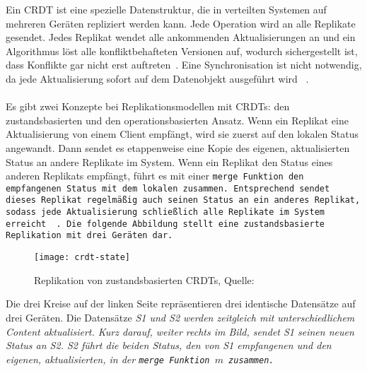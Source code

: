 %
%
Ein \gls{CRDT} ist eine spezielle Datenstruktur, die in verteilten Systemen auf mehreren Geräten repliziert werden kann. Jede Operation wird an alle Replikate gesendet. Jedes Replikat wendet alle ankommenden Aktualisierungen an und ein Algorithmus löst alle konfliktbehafteten Versionen auf, wodurch sichergestellt ist, dass Konflikte gar nicht erst auftreten~\cite{crdt_shapiro}. Eine Synchronisation ist nicht notwendig, da jede Aktualisierung sofort auf dem Datenobjekt ausgeführt wird ~\cite{crdt_shapiro2}.\\\\
%
Es gibt zwei Konzepte bei Replikationsmodellen mit \glspl{CRDT}: den zustandsbasierten und den operationsbasierten Ansatz.
%
Wenn ein Replikat eine Aktualisierung von einem Client empfängt, wird sie zuerst auf den lokalen Status angewandt.
Dann sendet es etappenweise eine Kopie des eigenen, aktualisierten Status an andere Replikate im System.
Wenn ein Replikat den Status eines anderen Replikats empfängt, führt es mit einer \tt{merge} Funktion den empfangenen Status mit dem lokalen zusammen.
Entsprechend sendet dieses Replikat regelmäßig auch seinen Status an ein anderes Replikat, sodass jede Aktualisierung schließlich alle Replikate im System erreicht ~\cite{crdt_shapiro2}.
Die folgende Abbildung stellt eine zustandsbasierte Replikation mit drei Geräten dar.
%
\begin{figure}[H]
  \centering
  \texttt{[image: crdt-state]}
  \grayRule
  \caption[Replikation von zustandsbasierten \glspl{CRDT}]{Replikation von zustandsbasierten \glspl{CRDT}, Quelle: ~\cite{crdt_shapiro2}}
  \label{fig:crdt-state}
\end{figure}
%
Die drei Kreise auf der linken Seite repräsentieren drei identische Datensätze auf drei Geräten.
Die Datensätze \it{S1} und \it{S2} werden zeitgleich mit unterschiedlichem Content aktualisiert.
Kurz darauf, weiter rechts im Bild, sendet \it{S1} seinen neuen Status an \it{S2}.
\it{S2} führt die beiden Status, den von \it{S1} empfangenen und den eigenen, aktualisierten, in der \tt{merge} Funktion $m$ zusammen.
